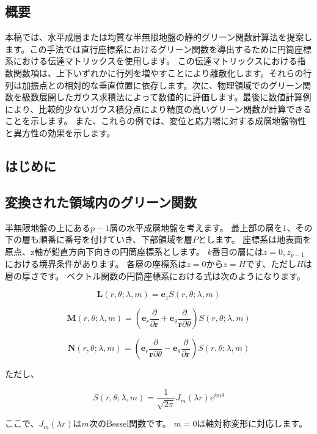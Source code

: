 \subsection{概要}

本稿では、水平成層または均質な半無限地盤の静的グリーン関数計算法を提案します。この手法では直行座標系におけるグリーン関数を導出するために円筒座標系における伝達マトリックスを使用します。
この伝達マトリックスにおける指数関数項は、上下いずれかに行列を増やすことにより離散化します。それらの行列は加振点との相対的な垂直位置に依存します。次に、物理領域でのグリーン関数を級数展開したガウス求積法によって数値的に評価します。最後に数値計算例により、比較的少ないガウス積分点により精度の高いグリーン関数が計算できることを示します。
また、これらの例では、変位と応力場に対する成層地盤物性と異方性の効果を示します。

\subsection{はじめに}

\subsection{変換された領域内のグリーン関数}

半無限地盤の上にある$p-1$層の水平成層地盤を考えます。
最上部の層を$1$、その下の層も順番に番号を付けていき、下部領域を層$P$とします。
座標系は地表面を原点、z軸が鉛直方向下向きの円筒座標系とします。
$k$番目の層には$z=0,z_{p-1}$における境界条件があります。
各層の座標系は$z=0$から$z=H$です、ただし$H$は層の厚さです。
ベクトル関数の円筒座標系における式は次のようになります。

\[\mathbf{L}\left(r,\theta;\lambda,m\right)=\mathbf{e}_{z}S\left(r,\theta;\lambda,m\right)\]

\[\mathbf{M}\left(r,\theta;\lambda,m\right)=\left(\mathbf{e}_{r}\dfrac{\partial}{\partial\mathbf{r}}+\mathbf{e}_{\theta}\dfrac{\partial}{\mathbf{r}\partial\theta}\right)S\left(r,\theta;\lambda,m\right)\]

\[\mathbf{N}\left(r,\theta;\lambda,m\right)=\left(\mathbf{e}_{r}\dfrac{\partial}{\mathbf{r}\partial\theta}-\mathbf{e}_{\theta}\dfrac{\partial}{\partial\mathbf{r}}\right)S\left(r,\theta;\lambda,m\right)\]

ただし、

\[S\left(r,\theta;\lambda,m\right)=\dfrac{1}{\sqrt{2\pi}}J_{m}\left(\lambda r\right)e^{im\theta}\]

ここで、$J_{m}(\lambda r)$は$m$次のBessel関数です。
$m=0$は軸対称変形に対応します。

